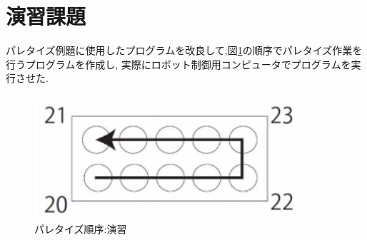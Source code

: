 \documentclass[a4paper,11pt]{jsarticle}
\begin{document}
\section{演習課題}
パレタイズ例題に使用したプログラムを改良して,図\ref{パレタイズ演習}の順序でパレタイズ作業を行うプログラムを作成し,
実際にロボット制御用コンピュータでプログラムを実行させた.

\begin{figure}[H]
  \begin{center}
    \includegraphics[width = 10cm]{画像/パターン1.png}
    \caption{パレタイズ順序:演習}
    \label{パレタイズ演習}
  \end{center}
\end{figure}
\end{document}
